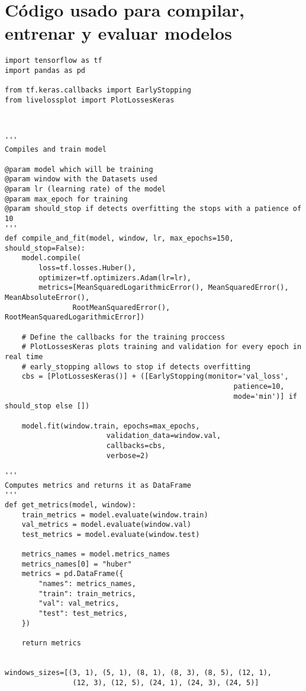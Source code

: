 \section{Código usado para compilar, entrenar y evaluar modelos} \label{app:compile_and_fit}

\begin{verbatim}
import tensorflow as tf
import pandas as pd

from tf.keras.callbacks import EarlyStopping
from livelossplot import PlotLossesKeras



'''
Compiles and train model

@param model which will be training
@param window with the Datasets used
@param lr (learning rate) of the model
@param max_epoch for training
@param should_stop if detects overfitting the stops with a patience of 10
'''
def compile_and_fit(model, window, lr, max_epochs=150, should_stop=False):
    model.compile(
        loss=tf.losses.Huber(),
        optimizer=tf.optimizers.Adam(lr=lr),
        metrics=[MeanSquaredLogarithmicError(), MeanSquaredError(), MeanAbsoluteError(),
                RootMeanSquaredError(), RootMeanSquaredLogarithmicError])
    
    # Define the callbacks for the training proccess
    # PlotLossesKeras plots training and validation for every epoch in real time
    # early_stopping allows to stop if detects overfitting
    cbs = [PlotLossesKeras()] + ([EarlyStopping(monitor='val_loss',
                                                      patience=10,
                                                      mode='min')] if should_stop else [])
    
    model.fit(window.train, epochs=max_epochs,
                        validation_data=window.val,
                        callbacks=cbs,
                        verbose=2)
    
'''
Computes metrics and returns it as DataFrame
'''
def get_metrics(model, window):
    train_metrics = model.evaluate(window.train)
    val_metrics = model.evaluate(window.val)
    test_metrics = model.evaluate(window.test)

    metrics_names = model.metrics_names
    metrics_names[0] = "huber"
    metrics = pd.DataFrame({
        "names": metrics_names,
        "train": train_metrics,
        "val": val_metrics,
        "test": test_metrics,
    })

    return metrics


windows_sizes=[(3, 1), (5, 1), (8, 1), (8, 3), (8, 5), (12, 1), 
                (12, 3), (12, 5), (24, 1), (24, 3), (24, 5)]


\end{verbatim}
